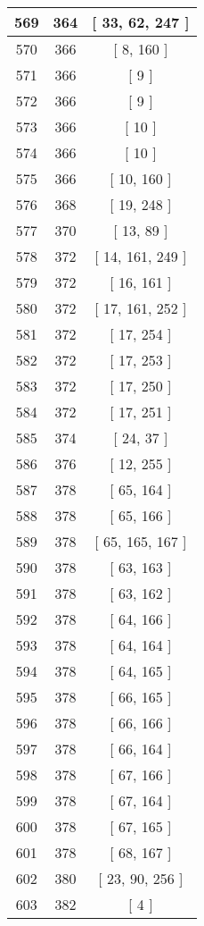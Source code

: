 \begin{center}
\begin{longtable}[H]{|| c c c ||}
569 & 364 & [ 33, 62, 247 ] \\ 
\hline
570 & 366 & [ 8, 160 ] \\ 
\hline
571 & 366 & [ 9 ] \\ 
\hline
572 & 366 & [ 9 ] \\ 
\hline
573 & 366 & [ 10 ] \\ 
\hline
574 & 366 & [ 10 ] \\ 
\hline
575 & 366 & [ 10, 160 ] \\ 
\hline
576 & 368 & [ 19, 248 ] \\ 
\hline
577 & 370 & [ 13, 89 ] \\ 
\hline
578 & 372 & [ 14, 161, 249 ] \\ 
\hline
579 & 372 & [ 16, 161 ] \\ 
\hline
580 & 372 & [ 17, 161, 252 ] \\ 
\hline
581 & 372 & [ 17, 254 ] \\ 
\hline
582 & 372 & [ 17, 253 ] \\ 
\hline
583 & 372 & [ 17, 250 ] \\ 
\hline
584 & 372 & [ 17, 251 ] \\ 
\hline
585 & 374 & [ 24, 37 ] \\ 
\hline
586 & 376 & [ 12, 255 ] \\ 
\hline
587 & 378 & [ 65, 164 ] \\ 
\hline
588 & 378 & [ 65, 166 ] \\ 
\hline
589 & 378 & [ 65, 165, 167 ] \\ 
\hline
590 & 378 & [ 63, 163 ] \\ 
\hline
591 & 378 & [ 63, 162 ] \\ 
\hline
592 & 378 & [ 64, 166 ] \\ 
\hline
593 & 378 & [ 64, 164 ] \\ 
\hline
594 & 378 & [ 64, 165 ] \\ 
\hline
595 & 378 & [ 66, 165 ] \\ 
\hline
596 & 378 & [ 66, 166 ] \\ 
\hline
597 & 378 & [ 66, 164 ] \\ 
\hline
598 & 378 & [ 67, 166 ] \\ 
\hline
599 & 378 & [ 67, 164 ] \\ 
\hline
600 & 378 & [ 67, 165 ] \\ 
\hline
601 & 378 & [ 68, 167 ] \\ 
\hline
602 & 380 & [ 23, 90, 256 ] \\ 
\hline
603 & 382 & [ 4 ] \\ 

\end{longtable}
\end{center}
